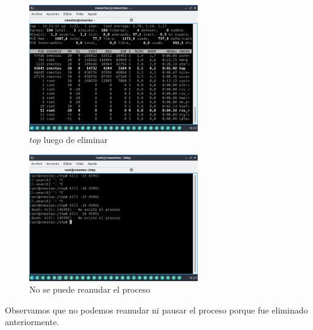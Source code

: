\documentclass[12pt]{article}
\begin{document}
\clearpage
\newpage

\begin{figure}[h]
    \centering
    \includegraphics[width=0.65\textwidth]{images/screenA35.jpg}
    \caption{$top$ luego de eliminar}
\end{figure}

\begin{figure}[h]
    \centering
    \includegraphics[width=0.65\textwidth]{images/screenA36.jpg}
    \caption{No se puede reanudar el proceso}
\end{figure}

Observamos que no podemos reanudar ni pausar el proceso porque fue eliminado anteriormente.
\end{document}
